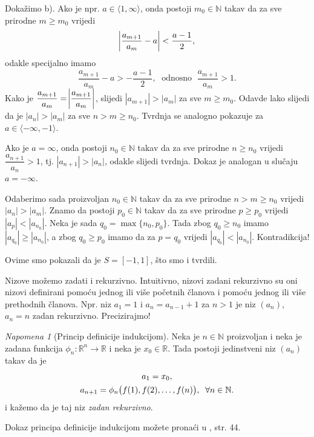 \documentclass{book}
\let\originalleft\left
\let\originalright\right
\renewcommand{\left}{\mathopen{}\mathclose\bgroup\originalleft}
\renewcommand{\right}{\aftergroup\egroup\originalright}
\renewenvironment{proof}{%
    \vspace{-\parskip}\begin{oldproof}%
    }{%
    \end{oldproof}%
}
\theoremstyle{definition}
\theoremstyle{definition}
\theoremstyle{remark}
\newtheorem{remark}{Napomena}
\begin{document}
\begin{proof}[Rješenje]
Dokažimo b). Ako je npr. $a\in \langle 1, \infty\rangle$, onda postoji $m_0\in \mathbb{N}$ takav da za sve prirodne $m\geq m_0$ vrijedi $$\abs{\dfrac{a_{m+1}}{a_m}-a}<\dfrac{a-1}{2},$$
odakle specijalno imamo
$$\dfrac{a_{m+1}}{a_m}-a>-\dfrac{a-1}{2},\;\text{ odnosno }\; \dfrac{a_{m+1}}{a_m}>1.$$
Kako je $\dfrac{a_{m+1}}{a_m}=\abs{\dfrac{a_{m+1}}{a_m}}$, slijedi $|a_{m+1}|>|a_m|$ za sve $m\geq m_0$. Odavde lako slijedi da je $|a_{n}|>|a_m|$ za sve $n>m\geq n_0$. Tvrdnja se analogno pokazuje za $a\in \langle -\infty, -1\rangle$.

Ako je $a=\infty$, onda postoji $n_0\in \mathbb{N}$ takav da za sve prirodne $n\geq n_0$ vrijedi $\dfrac{a_{n+1}}{a_n}>1$, tj. $|a_{n+1}|>|a_n|$, odakle slijedi tvrdnja. Dokaz je analogan u slučaju $a=-\infty$.

Odaberimo sada proizvoljan $n_0\in \mathbb{N}$ takav da za sve prirodne $n>m\geq n_0$ vrijedi $|a_n|>|a_m|$. Znamo da postoji $p_0\in \mathbb{N}$ takav da za sve prirodne $p\geq p_0$ vrijedi $|a_p|<|a_{n_0}|$. Neka je sada $q_0=\max\{n_0, p_0\}$. Tada zbog $q_0\geq n_0$ imamo $|a_{q_0}|\geq |a_{n_0}|$, a zbog $q_0\geq p_0$ imamo da za $p=q_0$ vrijedi $|a_{q_0}|<|a_{n_0}|$. Kontradikcija!

Ovime smo pokazali da je $S=[-1, 1]$, što smo i tvrdili.
\end{proof}
Nizove možemo zadati i rekurzivno. Intuitivno, nizovi zadani rekurzivno su oni nizovi definirani pomoću jednog ili više početnih članova i pomoću jednog ili više prethodnih članova. Npr. niz $a_1=1$ i $a_n=a_{n-1}+1$ za $n>1$ je niz $(a_n)$, $a_n=n$ zadan rekurzivno. Precizirajmo!
\begin{remark}[Princip definicije indukcijom]
Neka je $n\in \mathbb{N}$ proizvoljan i neka je zadana funkcija $\phi_n : \mathbb{R}^n\to \mathbb{R}$ i neka je $x_0\in \mathbb{R}$. Tada postoji jedinstveni niz $(a_n)$ takav da je
\begin{gather*}
a_1=x_0,\\
a_{n+1}=\phi_n\left( f(1), f(2), \dots, f(n)\right),\;\; \forall n\in \mathbb{N}.
\end{gather*}
i kažemo da je taj niz \textit{zadan rekurzivno}. 
\end{remark} 
Dokaz principa definicije indukcijom možete pronaći u \cite{9}, str. 44.
\end{document}
